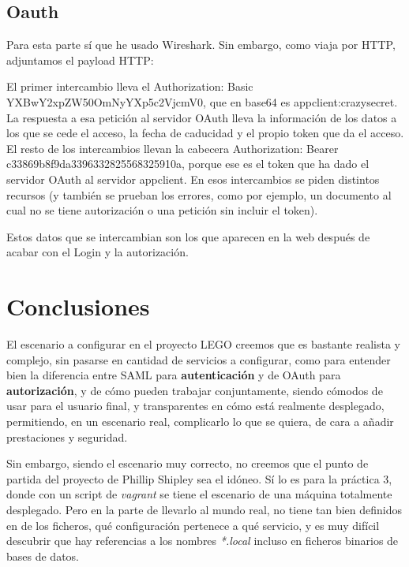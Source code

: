 \documentclass[]{article}
\begin{document}
\subsection{Oauth}

Para esta parte sí que he usado Wireshark. Sin embargo, como viaja por HTTP, adjuntamos el payload HTTP:


El primer intercambio lleva el Authorization: Basic YXBwY2xpZW50OmNyYXp5c2VjcmV0, que en base64 es appclient:crazysecret. La respuesta a esa petición al servidor OAuth lleva la información de los datos a los que se cede el acceso, la fecha de caducidad y el propio token que da el acceso. El resto de los intercambios llevan la cabecera Authorization: Bearer c33869b8f9da3396332825568325910a, porque ese es el token que ha dado el servidor OAuth al servidor appclient. En esos intercambios se piden distintos recursos (y también se prueban los errores, como por ejemplo, un documento al cual no se tiene autorización o una petición sin incluir el token).

Estos datos que se intercambian son los que aparecen en la web después de acabar con el Login y la autorización.

\section{Conclusiones}

El escenario a configurar en el proyecto LEGO creemos que es bastante realista y complejo, sin pasarse en cantidad de servicios a configurar, como para entender bien la diferencia entre SAML para \textbf{autenticación} y de OAuth para \textbf{autorización}, y de cómo pueden trabajar conjuntamente, siendo cómodos de usar para el usuario final, y transparentes en cómo está realmente desplegado, permitiendo, en un escenario real, complicarlo lo que se quiera, de cara a añadir prestaciones y seguridad.

\hfill

Sin embargo, siendo el escenario muy correcto, no creemos que el punto de partida del proyecto de Phillip Shipley sea el idóneo. Sí lo es para la práctica 3, donde con un script de \textit{vagrant} se tiene el escenario de una máquina totalmente desplegado. Pero en la parte de llevarlo al mundo real, no tiene tan bien definidos en de los ficheros, qué configuración pertenece a qué servicio, y es muy difícil descubrir que hay referencias a los nombres \textit{*.local} incluso en ficheros binarios de bases de datos.
\end{document}
